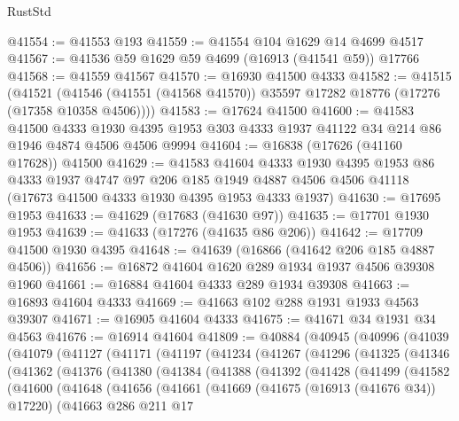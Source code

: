 \begin{lexlean}{RustStd}
\begin{coremodule}
@41554 := @41553 @193
@41559 := @41554 @104 @1629 @14 @4699 @4517
@41567 := @41536 @59 @1629 @59 @4699 (@16913 (@41541 @59)) @17766
@41568 := @41559 @41567
@41570 := @16930 @41500 @4333
@41582 := @41515
    (@41521 (@41546 (@41551 (@41568 @41570)) @35597 @17282 @18776 (@17276 (@17358 @10358 @4506))))
@41583 := @17624 @41500
@41600 := @41583
    @41500
    @4333
    @1930
    @4395
    @1953
    @303
    @4333
    @1937
    @41122
    @34
    @214
    @86
    @1946
    @4874
    @4506
    @4506
    @9994
@41604 := @16838 (@17626 (@41160 @17628)) @41500
@41629 := @41583
    @41604
    @4333
    @1930
    @4395
    @1953
    @86
    @4333
    @1937
    @4747
    @97
    @206
    @185
    @1949
    @4887
    @4506
    @4506
    @41118
    (@17673 @41500 @4333 @1930 @4395 @1953 @4333 @1937)
@41630 := @17695 @1953
@41633 := @41629 (@17683 (@41630 @97))
@41635 := @17701 @1930 @1953
@41639 := @41633 (@17276 (@41635 @86 @206))
@41642 := @17709 @41500 @1930 @4395
@41648 := @41639 (@16866 (@41642 @206 @185 @4887 @4506))
@41656 := @16872 @41604 @1620 @289 @1934 @1937 @4506 @39308 @1960
@41661 := @16884 @41604 @4333 @289 @1934 @39308
@41663 := @16893 @41604 @4333
@41669 := @41663 @102 @288 @1931 @1933 @4563 @39307
@41671 := @16905 @41604 @4333
@41675 := @41671 @34 @1931 @34 @4563
@41676 := @16914 @41604
@41809 := @40884
    (@40945
      (@40996
        (@41039
          (@41079
            (@41127
              (@41171
                (@41197
                  (@41234
                    (@41267
                      (@41296
                        (@41325
                          (@41346
                            (@41362
                              (@41376
                                (@41380
                                  (@41384
                                    (@41388
                                      (@41392
                                        (@41428
                                          (@41499
                                            (@41582
                                              (@41600
                                                (@41648
                                                  (@41656
                                                    (@41661
                                                      (@41669
                                                        (@41675 (@16913 (@41676 @34)) @17220)
                                                        (@41663
                                                          @286
                                                          @211
                                                          @17

\end{coremodule}
\end{lexlean}
